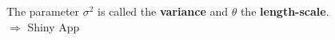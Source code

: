 \begin{frame}{}
\vspace{2mm}
\normalsize
The parameter $\sigma^2$ is called the \textbf{variance} and $\theta$ the \textbf{length-scale}.\\
\alert{$\Rightarrow$ Shiny App}
\end{frame}


